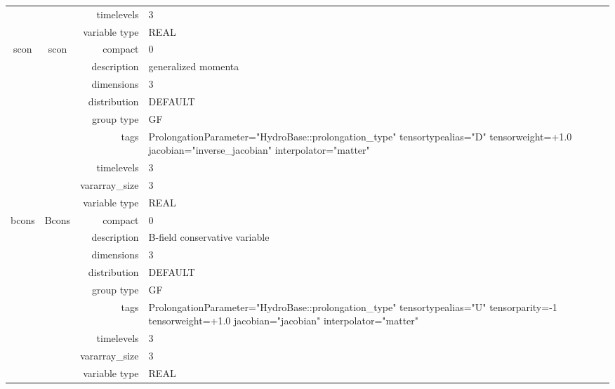 \begin{tabular*}{150mm}{|c|c@{\extracolsep{\fill}}|rl|}
 &  & timelevels & 3 \\ 
 &  & variable type & REAL \\ 
\hline 
scon & scon & compact & 0 \\ 
 &  & description & generalized momenta \\ 
 &  & dimensions & 3 \\ 
 &  & distribution & DEFAULT \\ 
 &  & group type & GF \\ 
 &  & tags & ProlongationParameter="HydroBase::prolongation\_type" tensortypealias="D" tensorweight=+1.0 jacobian="inverse\_jacobian" interpolator="matter" \\ 
 &  & timelevels & 3 \\ 
 &  & vararray\_size & 3 \\ 
 &  & variable type & REAL \\ 
\hline 
bcons & Bcons & compact & 0 \\ 
 &  & description & B-field conservative variable \\ 
 &  & dimensions & 3 \\ 
 &  & distribution & DEFAULT \\ 
 &  & group type & GF \\ 
 &  & tags & ProlongationParameter="HydroBase::prolongation\_type" tensortypealias="U" tensorparity=-1 tensorweight=+1.0 jacobian="jacobian" interpolator="matter" \\ 
 &  & timelevels & 3 \\ 
 &  & vararray\_size & 3 \\ 
 &  & variable type & REAL \\ 
\hline 
\end{tabular*} 



\vspace{5mm}
\vspace{5mm}

